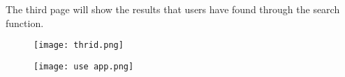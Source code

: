 \documentclass[conference]{IEEEtran}
\begin{document}
    The third page will show the results that users have found through the search function.
    
    \begin{figure}[h]
        \begin{center}
        \centering
        \texttt{[image: thrid.png]}
        \caption{}
        \label{fig:my_label}
        \end{center}
        \end{figure}
       \vspace{1\baselineskip}
        
        \begin{figure}[h]
        \begin{center}
        \centering
        \texttt{[image: use app.png]}
        \caption{}
        \label{fig:my_label}
        \end{center}
        \end{figure}
        
\end{document}
